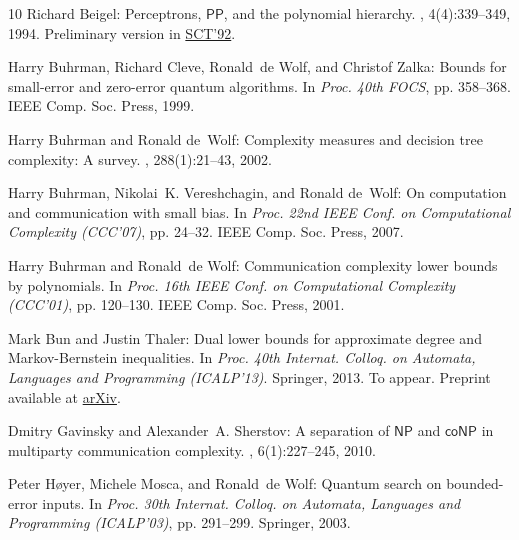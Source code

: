 \begin{thebibliography}{10}
{\sc Richard Beigel}: Perceptrons, {$\mathsf{PP}$}, and the polynomial
  hierarchy.
, 4(4):339--349, 1994.
\newblock Preliminary version in
  \href{http://dx.doi.org/10.1109/SCT.1992.215376}{SCT'92}.
\newblock [\epfmtdoi{10.1007/BF01263422}]

{\sc Harry Buhrman, Richard Cleve, Ronald~de Wolf, and Christof Zalka}: Bounds
  for small-error and zero-error quantum algorithms.
\newblock In {\em Proc. 40th FOCS}, pp. 358--368. IEEE Comp. Soc. Press, 1999.

{\sc Harry Buhrman and Ronald de~Wolf}: Complexity measures and decision tree
  complexity: {A} survey.
, 288(1):21--43, 2002.
\newblock [\epfmtdoi{10.1016/S0304-3975(01)00144-X}]

{\sc Harry Buhrman, Nikolai~K. Vereshchagin, and Ronald de~Wolf}: On
  computation and communication with small bias.
\newblock In {\em Proc. 22nd IEEE Conf. on Computational Complexity (CCC'07)},
  pp. 24--32. IEEE Comp. Soc. Press, 2007.

{\sc Harry Buhrman and Ronald~de Wolf}: Communication complexity lower bounds
  by polynomials.
\newblock In {\em Proc. 16th IEEE Conf. on Computational Complexity (CCC'01)},
  pp. 120--130. IEEE Comp. Soc. Press, 2001.

{\sc Mark Bun and Justin Thaler}: Dual lower bounds for approximate degree and
  {M}arkov-{B}ernstein inequalities.
\newblock In {\em Proc. 40th Internat. Colloq. on Automata, Languages and
  Programming (ICALP'13)}. Springer, 2013.
\newblock To appear. Preprint available at
  \href{http://arxiv.org/abs/1302.6191}{arXiv}.

{\sc Dmitry Gavinsky and Alexander~A. Sherstov}: A separation of
  {$\mathsf{NP}$} and {$\mathsf{coNP}$} in multiparty communication complexity.
, 6(1):227--245, 2010.

{\sc Peter H{\o}yer, Michele Mosca, and Ronald~de Wolf}: Quantum search on
  bounded-error inputs.
\newblock In {\em Proc. 30th Internat. Colloq. on Automata, Languages and
  Programming (ICALP'03)}, pp. 291--299. Springer, 2003.
\newblock [\epfmtdoi{10.1007/3-540-45061-0\_25}]


\end{thebibliography}
